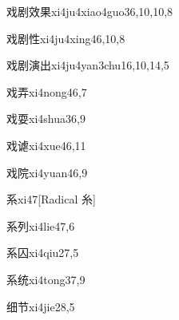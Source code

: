 \begin{verbete}{戏剧效果}{xi4ju4xiao4guo3}{6,10,10,8}
\end{verbete}

\begin{verbete}{戏剧性}{xi4ju4xing4}{6,10,8}
\end{verbete}

\begin{verbete}{戏剧演出}{xi4ju4yan3chu1}{6,10,14,5}
\end{verbete}

\begin{verbete}{戏弄}{xi4nong4}{6,7}
\end{verbete}

\begin{verbete}{戏耍}{xi4shua3}{6,9}
\end{verbete}

\begin{verbete}{戏谑}{xi4xue4}{6,11}
\end{verbete}

\begin{verbete}{戏院}{xi4yuan4}{6,9}
\end{verbete}

\begin{verbete}{系}{xi4}{7}[Radical 糸]
\end{verbete}

\begin{verbete}{系列}{xi4lie4}{7,6}
\end{verbete}

\begin{verbete}{系囚}{xi4qiu2}{7,5}
\end{verbete}

\begin{verbete}{系统}{xi4tong3}{7,9}
\end{verbete}

\begin{verbete}{细节}{xi4jie2}{8,5}
\end{verbete}

